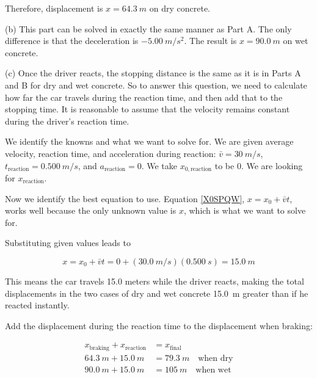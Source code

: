 \documentclass[main-ap-physics.tex]{subfiles}
\begin{document}
Therefore, displacement is $x = \SI{64.3}{m}$ on dry concrete.

\vspace{1em}

(b) This part can be solved in exactly the same manner as Part A. The only difference is that the deceleration is $-\SI{5.00}{m/s^2}$. The result is $x = \SI{90.0}{m}$ on wet concrete.

\vspace{1em}

(c) Once the driver reacts, the stopping distance is the same as it is in Parts A and B for dry and wet concrete. So to answer this question, we need to calculate how far the car travels during the reaction time, and then add that to the stopping time. It is reasonable to assume that the velocity remains constant during the driver’s reaction time.

\vspace{1em}

We identify the knowns and what we want to solve for. We are given average velocity, reaction time, and acceleration during reaction: $\bar{v} = \SI{30}{m/s}$, $t_{\text{reaction}} = \SI{0.500}{m/s}$, and $a_{\text{reaction}} = 0$.  We take $x_{0,\text{reaction}}$ to be 0. We are looking for $x_{\text{reaction}}$. 

\vspace{1em} 

Now we identify the best equation to use. Equation \eqref{X0SPQW}, $x = x_0 + \bar{v} t$, works well because the only unknown value is $x$, which is what we want to solve for. 

\vspace{1em}

Substituting given values leads to 

\begin{equation*}
    x = x_0 + \bar{v} t = 0 + \left(\SI{30.0}{m/s}\right) \left(\SI{0.500}{s}\right) = \SI{15.0}{m}
\end{equation*}

This means the car travels 15.0 meters while the driver reacts, making the total displacements in the two cases of dry and wet concrete \SI{15.0}{m} greater than if he reacted instantly.

\vspace{1em}

Add the displacement during the reaction time to the displacement when braking:

\begin{align*}
    x_{\text{braking}} + x_{\text{reaction}} &= x_{\text{final}}\\[1ex]
    \SI{64.3}{m} + \SI{15.0}{m} &= \SI{79.3}{m} \quad \text{when dry}\\
    \SI{90.0}{m} + \SI{15.0}{m} &= \SI{105}{m} \quad \text{when wet}
\end{align*}
\end{document}
